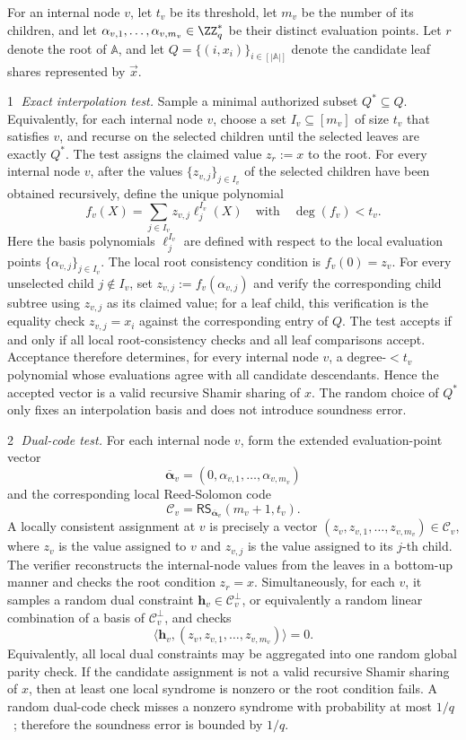 \documentclass[runningheads]{llncs}
\begin{document}
For an internal node \(v\), let \(t_v\) be its threshold, let \(m_v\) be the number of its children, and let \(\alpha_{v,1},\ldots,\alpha_{v,m_v}\in\ZZ_q^*\) be their distinct evaluation points. Let \(r\) denote the root of \(\mathbb{A}\), and let \(Q=\{(i,x_i)\}_{i\in[|\mathbb{A}|]}\) denote the candidate leaf shares represented by \(\vec{x}\).

\textcircled{1} \emph{Exact interpolation test.}
Sample a minimal authorized subset \(Q^*\subseteq Q\). Equivalently, for each internal node \(v\), choose a set \(I_v\subseteq[m_v]\) of size \(t_v\) that satisfies \(v\), and recurse on the selected children until the selected leaves are exactly \(Q^*\). The test assigns the claimed value \(z_r:=x\) to the root. For every internal node \(v\), after the values \(\{z_{v,j}\}_{j\in I_v}\) of the selected children have been obtained recursively, define the unique polynomial
\[
    f_v(X)=\sum_{j\in I_v} z_{v,j}\ell_j^{I_v}(X)
    \quad\text{with}\quad \deg(f_v)<t_v .
\]
Here the basis polynomials \(\ell_j^{I_v}\) are defined with respect to the local evaluation points \(\{\alpha_{v,j}\}_{j\in I_v}\).
The local root consistency condition is \(f_v(0)=z_v\). For every unselected child \(j\notin I_v\), set \(z_{v,j}:=f_v(\alpha_{v,j})\) and verify the corresponding child subtree using \(z_{v,j}\) as its claimed value; for a leaf child, this verification is the equality check \(z_{v,j}=x_i\) against the corresponding entry of \(Q\). The test accepts if and only if all local root-consistency checks and all leaf comparisons accept. Acceptance therefore determines, for every internal node \(v\), a degree-\(<t_v\) polynomial whose evaluations agree with all candidate descendants. Hence the accepted vector is a valid recursive Shamir sharing of \(x\). The random choice of \(Q^*\) only fixes an interpolation basis and does not introduce soundness error.

\textcircled{2} \emph{Dual-code test.}
For each internal node \(v\), form the extended evaluation-point vector
\[
    \overline{\boldsymbol{\alpha}}_v=(0,\alpha_{v,1},\ldots,\alpha_{v,m_v})
\]
and the corresponding local Reed-Solomon code
\[
    \mathcal{C}_v=\mathsf{RS}_{\overline{\boldsymbol{\alpha}}_v}(m_v+1,t_v).
\]
A locally consistent assignment at \(v\) is precisely a vector
\((z_v,z_{v,1},\ldots,z_{v,m_v})\in\mathcal{C}_v\), where \(z_v\) is the value assigned to \(v\) and \(z_{v,j}\) is the value assigned to its \(j\)-th child. The verifier reconstructs the internal-node values from the leaves in a bottom-up manner and checks the root condition \(z_r=x\). Simultaneously, for each \(v\), it samples a random dual constraint \(\boldsymbol{h}_v\in\mathcal{C}_v^\perp\), or equivalently a random linear combination of a basis of \(\mathcal{C}_v^\perp\), and checks
\[
    \langle \boldsymbol{h}_v,(z_v,z_{v,1},\ldots,z_{v,m_v})\rangle=0.
\]
Equivalently, all local dual constraints may be aggregated into one random global parity check. If the candidate assignment is not a valid recursive Shamir sharing of \(x\), then at least one local syndrome is nonzero or the root condition fails. A random dual-code check misses a nonzero syndrome with probability at most \(1/q\)~\cite{Cascudo2017PVSS}; therefore the soundness error is bounded by \(1/q\).
\end{document}
